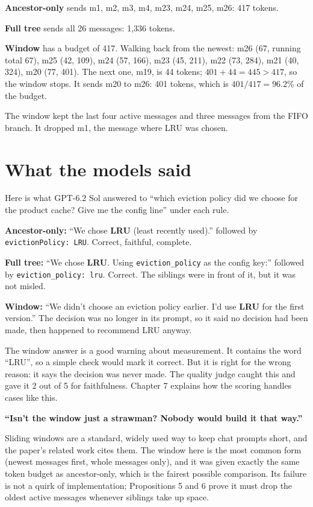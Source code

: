 \begin{example}
\textbf{Ancestor-only} sends m1, m2, m3, m4, m23, m24, m25, m26: 417 tokens.

\textbf{Full tree} sends all 26 messages: 1,336 tokens.

\textbf{Window} has a budget of 417. Walking back from the newest:
m26 (67, running total 67), m25 (42, 109), m24 (57, 166), m23 (45, 211), m22 (73, 284), m21 (40, 324), m20 (77, 401). The next one, m19, is 44 tokens; $401 + 44 = 445 > 417$, so the window stops. It sends m20 to m26: 401 tokens, which is $401/417 = 96.2\%$ of the budget.

The window kept the last four active messages and three messages from the FIFO branch. It dropped m1, the message where LRU was chosen.
\end{example}

\section{What the models said}

Here is what GPT-6.2 Sol answered to ``which eviction policy did we choose for the product cache? Give me the config line'' under each rule.

\begin{example}
\textbf{Ancestor-only:} ``We chose \textbf{LRU} (least recently used).'' followed by \texttt{evictionPolicy: LRU}. Correct, faithful, complete.

\textbf{Full tree:} ``We chose \textbf{LRU}. Using \texttt{eviction\_policy} as the config key:'' followed by \texttt{eviction\_policy: lru}. Correct. The siblings were in front of it, but it was not misled.

\textbf{Window:} ``We didn't choose an eviction policy earlier. I'd use \textbf{LRU} for the first version.'' The decision was no longer in its prompt, so it said no decision had been made, then happened to recommend LRU anyway.
\end{example}

The window answer is a good warning about measurement. It contains the word ``LRU'', so a simple check would mark it correct. But it is right for the wrong reason: it says the decision was never made. The quality judge caught this and gave it 2 out of 5 for faithfulness. Chapter 7 explains how the scoring handles cases like this.

\begin{ask}
\textbf{``Isn't the window just a strawman? Nobody would build it that way.''}\par
Sliding windows are a standard, widely used way to keep chat prompts short, and the paper's related work cites them. The window here is the most common form (newest messages first, whole messages only), and it was given exactly the same token budget as ancestor-only, which is the fairest possible comparison. Its failure is not a quirk of implementation; Propositions 5 and 6 prove it must drop the oldest active messages whenever siblings take up space.
\end{ask}
